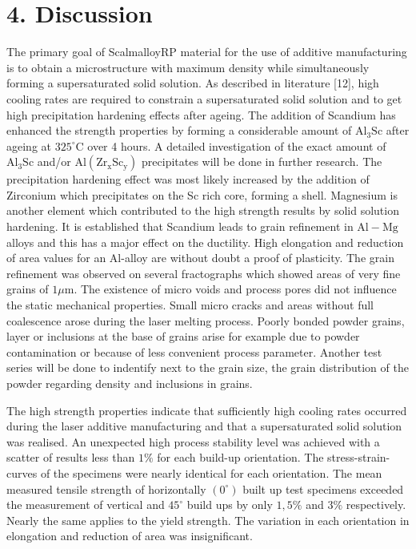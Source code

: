 \documentclass[10pt]{article}
\begin{document}
\section*{4. Discussion}
The primary goal of ScalmalloyRP material for the use of additive manufacturing is to obtain a microstructure with maximum density while simultaneously forming a supersaturated solid solution. As described in literature [12], high cooling rates are required to constrain a supersaturated solid solution and to get high precipitation hardening effects after ageing. The addition of Scandium has enhanced the strength properties by forming a considerable amount of $\mathrm{Al}_{3} \mathrm{Sc}$ after ageing at $325^{\circ} \mathrm{C}$ over 4 hours. A detailed investigation of the exact amount of $\mathrm{Al}_{3} \mathrm{Sc}$ and/or $\mathrm{Al}\left(\mathrm{Zr}_{\mathrm{x}} \mathrm{Sc}_{\mathrm{y}}\right)$ precipitates will be done in further research. The precipitation hardening effect was most likely increased by the addition of Zirconium which precipitates on the Sc rich core, forming a shell. Magnesium is another element which contributed to the high strength results by solid solution hardening. It is established that Scandium leads to grain refinement in $\mathrm{Al}-\mathrm{Mg}$ alloys and this has a major effect on the ductility. High elongation and reduction of area values for an Al-alloy are without doubt a proof of plasticity. The grain refinement was observed on several fractographs which showed areas of very fine grains of $1 \mu \mathrm{m}$. The existence of micro voids and process pores did not influence the static mechanical properties. Small micro cracks and areas without full coalescence arose during the laser melting process. Poorly bonded powder grains, layer or inclusions at the base of grains arise for example due to powder contamination or because of less convenient process parameter. Another test series will be done to indentify next to the grain size, the grain distribution of the powder regarding density and inclusions in grains.

The high strength properties indicate that sufficiently high cooling rates occurred during the laser additive manufacturing and that a supersaturated solid solution was realised. An unexpected high process stability level was achieved with a scatter of results less than $1 \%$ for each build-up orientation. The stress-strain-curves of the specimens were nearly identical for each orientation. The mean measured tensile strength of horizontally $\left(0^{\circ}\right)$ built up test specimens exceeded the measurement of vertical and $45^{\circ}$ build ups by only $1,5 \%$ and $3 \%$ respectively. Nearly the same applies to the yield strength. The variation in each orientation in elongation and reduction of area was insignificant.
\end{document}
